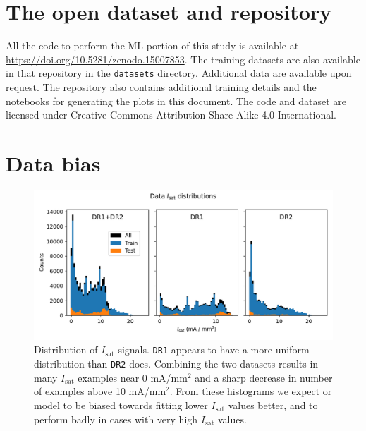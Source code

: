 \appendix

\section{The open dataset and repository} 
\label{app:repo}
All the code to perform the ML portion of this study is available at \url{https://doi.org/10.5281/zenodo.15007853}. The training datasets are also available in that repository in the \texttt{datasets} directory. Additional data are available upon request. The repository also contains additional training details and the notebooks for generating the plots in this document. The code and dataset are licensed under Creative Commons Attribution Share Alike 4.0 International. 

%

\section{Data bias \label{sec:app_bias}}

\begin{figure}
	\centering
	\includegraphics[width=\textwidth]{figures/PP1_02_isat_distribution.pdf}
	\caption[size=12]{\label{fig:PP1_02_isat_distribution}Distribution of $I_\text{sat}$ signals. \texttt{DR1} appears to have a more uniform distribution than \texttt{DR2} does. Combining the two datasets results in many $I_\text{sat}$ examples near 0 mA/mm$^2$ and a sharp decrease in number of examples above 10 mA/mm$^2$. From these histograms we expect or model to be biased towards fitting lower $I_\text{sat}$ values better, and to perform badly in cases with very high $I_\text{sat}$ values.}
\end{figure}

